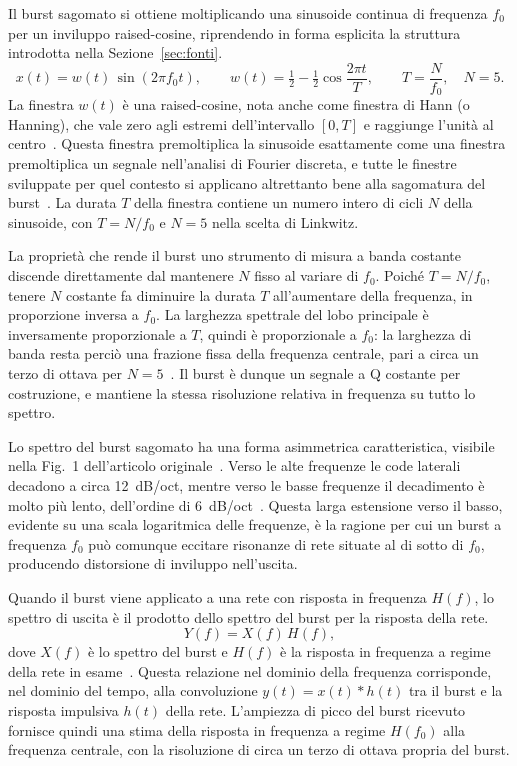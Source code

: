 \documentclass[11pt,a4paper]{article}
\begin{document}
Il burst sagomato si ottiene moltiplicando una sinusoide continua di frequenza $f_0$ per un inviluppo raised-cosine, riprendendo in forma esplicita la struttura introdotta nella Sezione~\ref{sec:fonti}.
\begin{equation}
x(t) = w(t)\,\sin(2\pi f_0 t), \qquad
w(t) = \tfrac{1}{2} - \tfrac{1}{2}\cos\!\frac{2\pi t}{T}, \qquad
T = \frac{N}{f_0}, \quad N = 5 .
\end{equation}
La finestra $w(t)$ è una raised-cosine, nota anche come finestra di Hann (o Hanning), che vale zero agli estremi dell'intervallo $[0,T]$ e raggiunge l'unità al centro~\cite{linkwitz1980shaped}.
Questa finestra premoltiplica la sinusoide esattamente come una finestra premoltiplica un segnale nell'analisi di Fourier discreta, e tutte le finestre sviluppate per quel contesto si applicano altrettanto bene alla sagomatura del burst~\cite{linkwitz1980shaped}.
La durata $T$ della finestra contiene un numero intero di cicli $N$ della sinusoide, con $T = N/f_0$ e $N = 5$ nella scelta di Linkwitz.

La proprietà che rende il burst uno strumento di misura a banda costante discende direttamente dal mantenere $N$ fisso al variare di $f_0$.
Poiché $T = N/f_0$, tenere $N$ costante fa diminuire la durata $T$ all'aumentare della frequenza, in proporzione inversa a $f_0$.
La larghezza spettrale del lobo principale è inversamente proporzionale a $T$, quindi è proporzionale a $f_0$: la larghezza di banda resta perciò una frazione fissa della frequenza centrale, pari a circa un terzo di ottava per $N = 5$~\cite{linkwitz1980shaped}.
Il burst è dunque un segnale a Q costante per costruzione, e mantiene la stessa risoluzione relativa in frequenza su tutto lo spettro.

Lo spettro del burst sagomato ha una forma asimmetrica caratteristica, visibile nella Fig.~1 dell'articolo originale~\cite{linkwitz1980shaped}.
Verso le alte frequenze le code laterali decadono a circa \SI{12}{dB/oct}, mentre verso le basse frequenze il decadimento è molto più lento, dell'ordine di \SI{6}{dB/oct}~\cite{linkwitz1980shaped}.
Questa larga estensione verso il basso, evidente su una scala logaritmica delle frequenze, è la ragione per cui un burst a frequenza $f_0$ può comunque eccitare risonanze di rete situate al di sotto di $f_0$, producendo distorsione di inviluppo nell'uscita.

Quando il burst viene applicato a una rete con risposta in frequenza $H(f)$, lo spettro di uscita è il prodotto dello spettro del burst per la risposta della rete.
\begin{equation}
Y(f) = X(f)\,H(f),
\end{equation}
dove $X(f)$ è lo spettro del burst e $H(f)$ è la risposta in frequenza a regime della rete in esame~\cite{linkwitz1980shaped}.
Questa relazione nel dominio della frequenza corrisponde, nel dominio del tempo, alla convoluzione $y(t) = x(t) \ast h(t)$ tra il burst e la risposta impulsiva $h(t)$ della rete.
L'ampiezza di picco del burst ricevuto fornisce quindi una stima della risposta in frequenza a regime $H(f_0)$ alla frequenza centrale, con la risoluzione di circa un terzo di ottava propria del burst.
\end{document}
